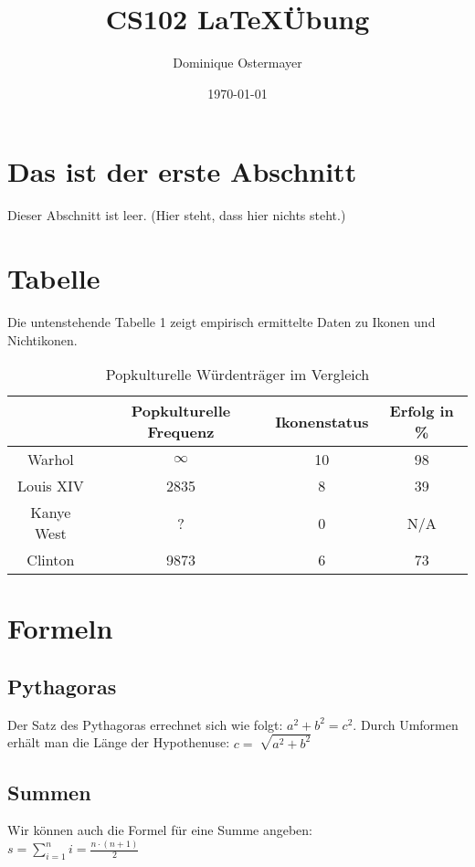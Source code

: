 \documentclass{article}
\author{Dominique Ostermayer}
\title{CS102 \LaTeX	\"Ubung}
\date{\today}
\begin{document}
\maketitle

\section{Das ist der erste Abschnitt}
Dieser Abschnitt ist leer. (Hier steht, dass hier nichts steht.)

\section{Tabelle}
Die untenstehende Tabelle 1 zeigt empirisch ermittelte Daten zu Ikonen und Nichtikonen.

\begin{table}[h]
\centering
\begin{tabular}{c|c|c|c}
\hspace{3 pt} & Popkulturelle Frequenz & Ikonenstatus & Erfolg in \% \\
\hline
Warhol & $\infty$ & 10 & 98 \\
Louis XIV & 2835 & 8 & 39 \\
Kanye West & ? & 0 & N/A \\
Clinton & 9873 & 6 & 73
\end{tabular}
\caption{Popkulturelle W\"urdentr\"ager im Vergleich}
\end{table}

\section{Formeln}
\subsection{Pythagoras}
Der Satz des Pythagoras errechnet sich wie folgt: $a^2 + b^2 = c^2$. Durch Umformen erh\"alt man die L\"ange der Hypothenuse: $c = \sqrt[]{a^2 + b^2}$ \\
\subsection{Summen}
Wir k\"onnen auch die Formel f\"ur eine Summe angeben: \\

$s = \sum\limits_{i=1}^n i = \frac{n \cdot (n + 1)}{2}$
\centering
   
\end{document}
